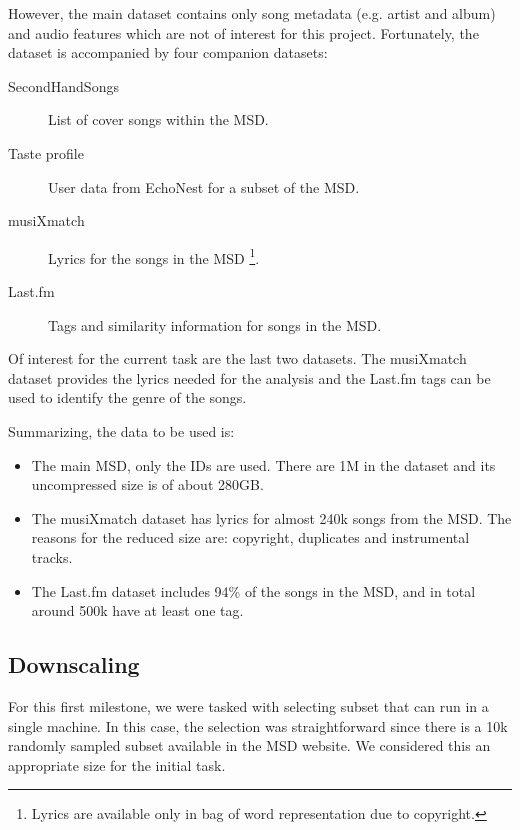 \documentclass[10pt,a4paper]{scrartcl}
\begin{document}
    However, the main dataset contains only song metadata
    (e.g. artist and album) and audio features which are not of interest
    for this project. Fortunately, the dataset is accompanied by four companion
    datasets:
    
    \begin{description}
      \item[SecondHandSongs] List of cover songs within the MSD.
      \item[Taste profile] User data from EchoNest for a subset of the MSD.
      \item[musiXmatch] Lyrics for the songs in the MSD
                        \footnote{Lyrics are available only in bag of word
                                  representation due to copyright.}.
      \item[Last.fm] Tags and similarity information for songs in the MSD.
    \end{description}
    
    Of interest for the current task are the last two datasets. The musiXmatch
    dataset provides the lyrics needed for the analysis and the Last.fm tags can
    be used to identify the genre of the songs.
    
    Summarizing, the data to be used is:
    
    \begin{itemize}
      \item The main MSD, only the IDs are used. There are 1M in the
            dataset and its uncompressed size is of about 280GB.
      \item The musiXmatch dataset has lyrics for almost 240k songs from the
            MSD. The reasons for the reduced size are: copyright, duplicates and
            instrumental tracks.
      \item The Last.fm dataset includes 94\% of the songs in the MSD, and in
            total around 500k have at least one tag.
    \end{itemize}

    \subsection{Downscaling}
    For this first milestone, we were tasked with selecting subset that can
    run in a single machine. In this case, the selection was straightforward
    since there is a 10k randomly sampled subset available in the MSD website.
    We considered this an appropriate size for the initial task.
    
\end{document}
